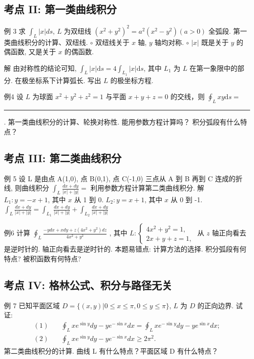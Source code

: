 
\subsection*{考点 II: 第一类曲线积分}

例 3
求 \(\int_L |x| ds\), \(L\) 为双纽线 \((x^2 + y^2)^2 = a^2(x^2 - y^2)(a > 0)\) 全弧段.
第一类曲线积分的计算、双纽线.
$\circ$ 双纽线关于 \(x\) 轴, \(y\) 轴均对称.
$\circ$ \(|x|\) 既是关于 \(y\) 的偶函数, 又是关于 \(x\) 的偶函数.

解 由对称性的结论可知, \(\int_{L} |x| \mathrm{d}s = 4 \int_{L_{1}} |x| \mathrm{d}s\), 其中 \(L_{1}\) 为 \(L\) 在第一象限中的部分. 在极坐标系下计算弧长. 写出 \(L\) 的极坐标方程.

例4 设 \(L\) 为球面 \(x^{2} + y^{2} + z^{2} = 1\) 与平面 \(x + y + z = 0\) 的交线，则 \(\oint_{L} x y \mathrm{d}s =\) \rule{3cm}{0.4pt}.
第一类曲线积分的计算、轮换对称性.
能用参数方程计算吗？
积分弧段有什么特点？


\subsection*{考点 III: 第二类曲线积分}

例 5
设 L 是由点 A(1,0), 点 B(0,1), 点 C(-1,0) 三点从 A 到 B 再到 C 连成的折线, 则曲线积分 \(\int_{L} \frac{dx+dy}{|x|+|y|} =\)
利用参数方程计算第二类曲线积分.
解 \(L_1: y = -x + 1\), 其中 \(x\) 从 1 到 0. \(L_2: y = x + 1\), 其中 \(x\) 从 0 到 -1. \(\int_{L} \frac{dx+dy}{|x|+|y|} = \int_{L_1} \frac{dx+dy}{|x|+|y|} + \int_{L_2} \frac{dx+dy}{|x|+|y|}\)

例6
计算 \(\oint_{L} \frac{- ydx + xdy + z(4x^{2} + y^{2})dz}{4x^{2} + y^{2}}\) , 其中 \(L: \left\{ \begin{array}{l}4x^{2} + y^{2} = 1, \\ 2x + y + z = 1, \end{array} \right.\) 从 \(z\) 轴正向看去是逆时针的.
轴正向看去是逆时针的.
本题易错点: 计算方法的选择.
积分弧段有何特点? 被积函数有何特点?


\subsection*{考点 IV: 格林公式、积分与路径无关}

例 7
已知平面区域 \(D = \{(x, y) | 0 \le x \le \pi, 0 \le y \le \pi\}\), \(L\) 为 \(D\) 的正向边界. 试证:
\begin{align*}
(1) \quad & \oint_L xe^{\sin y} dy - ye^{-\sin x} dx = \oint_L xe^{-\sin y} dy - ye^{\sin x} dx; \\
(2) \quad & \oint_L xe^{\sin y} dy - ye^{-\sin x} dx \ge 2\pi^2.
\end{align*}
第二类曲线积分的计算.
曲线 L 有什么特点？平面区域 D 有什么特点？

